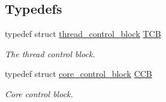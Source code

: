 \subsection*{Typedefs}
\begin{DoxyCompactItemize}
\item 
typedef struct \hyperlink{structthread__control__block}{thread\-\_\-control\-\_\-block} \hyperlink{group__scheduler_gaf88d9c946bf70b36a1e8bc34383abfc9}{T\-C\-B}
\begin{DoxyCompactList}\small\item\em The thread control block. \end{DoxyCompactList}\item 
typedef struct \hyperlink{structcore__control__block}{core\-\_\-control\-\_\-block} \hyperlink{group__scheduler_ga7485b31e0dd9fd723bc2d75fba5206a0}{C\-C\-B}
\begin{DoxyCompactList}\small\item\em Core control block. \end{DoxyCompactList}\end{DoxyCompactItemize}
